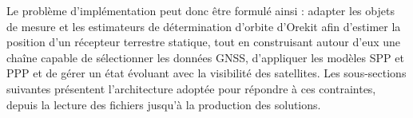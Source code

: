Le problème d'implémentation peut donc être formulé ainsi : adapter les objets
de mesure et les estimateurs de détermination d'orbite d'Orekit afin d'estimer
la position d'un récepteur terrestre statique, tout en construisant autour
d'eux une chaîne capable de sélectionner les données GNSS, d'appliquer les
modèles SPP et PPP et de gérer un état évoluant avec la visibilité des
satellites. Les sous-sections suivantes présentent l'architecture adoptée pour
répondre à ces contraintes, depuis la lecture des fichiers jusqu'à la
production des solutions.
\fi
